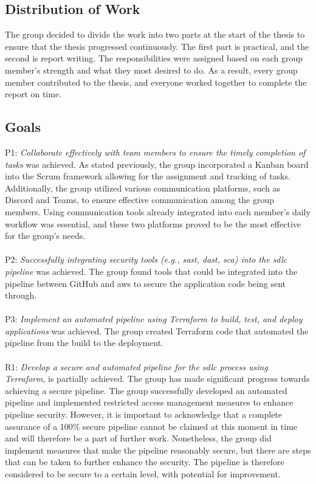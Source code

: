 \subsection{Distribution of Work}
The group decided to divide the work into two parts at the start of the thesis to ensure that the thesis progressed continuously. The first part is practical, and the second is report writing. The responsibilities were assigned based on each group member's strength and what they most desired to do. As a result, every group member contributed to the thesis, and everyone worked together to complete the report on time. 

\subsection{Goals}
P1: \textit{Collaborate effectively with team members to ensure the timely completion of tasks} was achieved. As stated previously, the group incorporated a Kanban board into the Scrum framework allowing for the assignment and tracking of tasks. Additionally, the group utilized various communication platforms, such as Discord and Teams, to ensure effective communication among the group members. Using communication tools already integrated into each member's daily workflow was essential, and these two platforms proved to be the most effective for the group's needs. 
\\~\\
P2: \textit{Successfully integrating security tools (e.g., \acrshort{sast}, \acrshort{dast}, \acrshort{sca}) into the \acrshort{sdlc} \gls{pipeline}} was achieved. The group found tools that could be integrated into the \gls{pipeline} between GitHub and \acrshort{aws} to secure the application code being sent through.
\\~\\
P3: \textit{Implement an automated \gls{pipeline} using Terraform to build, test, and deploy applications} was achieved. The group created Terraform code that automated the pipeline from the build to the deployment. 
\\~\\
R1: \textit{Develop a secure and automated \gls{pipeline} for the \acrshort{sdlc} process using Terraform}, is partially achieved. The group has made significant progress towards achieving a secure pipeline. The group successfully developed an automated \acrshort{pipeline} and implemented restricted access management measures to enhance pipeline security. However, it is important to acknowledge that a complete assurance of a 100\% secure \acrshort{pipeline} cannot be claimed at this moment in time and will therefore be a part of further work. Nonetheless, the group did implement measures that make the \acrshort{pipeline} reasonably secure, but there are steps that can be taken to further enhance the security. The \acrshort{pipeline} is therefore considered to be secure to a certain level, with potential for improvement.  


